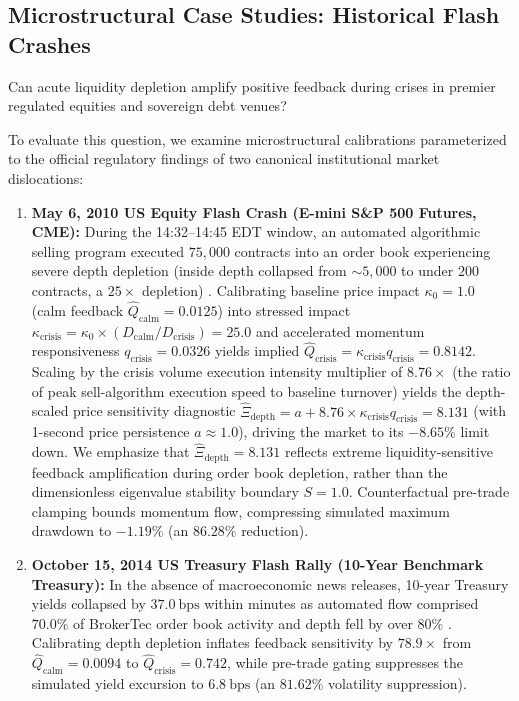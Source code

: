 \documentclass[12pt]{article}
\theoremstyle{definition}
\theoremstyle{remark}
\begin{document}
\subsection{Microstructural Case Studies: Historical Flash Crashes}
\label{sec:historical_flash_crashes}
Can acute liquidity depletion amplify positive feedback during crises in premier regulated equities and sovereign debt venues?

To evaluate this question, we examine microstructural calibrations parameterized to the official regulatory findings of two canonical institutional market dislocations:
\begin{enumerate}[noitemsep,topsep=2pt]
    \item \textbf{May 6, 2010 US Equity Flash Crash (E-mini S\&P 500 Futures, CME):} During the 14:32--14:45 EDT window, an automated algorithmic selling program executed $75{,}000$ contracts into an order book experiencing severe depth depletion (inside depth collapsed from $\sim 5{,}000$ to under $200$ contracts, a $25\times$ depletion) \citep{cftc_sec_2010}. Calibrating baseline price impact $\kappa_0 = 1.0$ (calm feedback $\hat{Q}_{\text{calm}} = 0.0125$) into stressed impact $\kappa_{\text{crisis}} = \kappa_0 \times (D_{\text{calm}}/D_{\text{crisis}}) = 25.0$ and accelerated momentum responsiveness $q_{\text{crisis}} = 0.0326$ yields implied $\hat{Q}_{\text{crisis}} = \kappa_{\text{crisis}} q_{\text{crisis}} = 0.8142$. Scaling by the crisis volume execution intensity multiplier of $8.76\times$ (the ratio of peak sell-algorithm execution speed to baseline turnover) yields the depth-scaled price sensitivity diagnostic $\hat{\Xi}_{\text{depth}} = a + 8.76 \times \kappa_{\text{crisis}} q_{\text{crisis}} = 8.131$ (with 1-second price persistence $a \approx 1.0$), driving the market to its $-8.65\%$ limit down. We emphasize that $\hat{\Xi}_{\text{depth}} = 8.131$ reflects extreme liquidity-sensitive feedback amplification during order book depletion, rather than the dimensionless eigenvalue stability boundary $S=1.0$. Counterfactual pre-trade clamping bounds momentum flow, compressing simulated maximum drawdown to $-1.19\%$ (an $86.28\%$ reduction).
    \item \textbf{October 15, 2014 US Treasury Flash Rally (10-Year Benchmark Treasury):} In the absence of macroeconomic news releases, 10-year Treasury yields collapsed by $37.0~\text{bps}$ within minutes as automated flow comprised $70.0\%$ of BrokerTec order book activity and depth fell by over $80\%$ \citep{joint_treasury_2015}. Calibrating depth depletion inflates feedback sensitivity by \textbf{$78.9\times$} from $\hat{Q}_{\text{calm}} = 0.0094$ to $\hat{Q}_{\text{crisis}} = \mathbf{0.742}$, while pre-trade gating suppresses the simulated yield excursion to $6.8~\text{bps}$ (an $81.62\%$ volatility suppression).
\end{enumerate}
\end{document}
